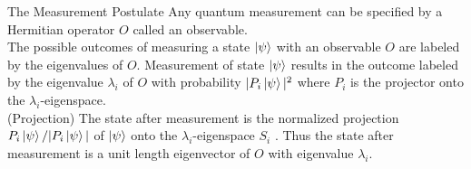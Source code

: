 \documentclass{beamer}
\begin{document}
\begin{frame}{The Measurement Postulate}
  {\tiny
    Any quantum measurement can be specified by a Hermitian operator $O$ called an observable.\\
    The possible outcomes of measuring a state $\ket{\psi}$ with an observable $O$ are labeled by the
    eigenvalues of $O$. Measurement of state $\ket{\psi}$ results in the outcome labeled by the eigenvalue $\lambda_i$
    of $O$ with probability $|P_i\ket{\psi}|^2$ where $P_i$ is the projector onto the $\lambda_i$-eigenspace.\\
    (Projection) The state after measurement is the normalized projection $P_i\ket{\psi} / |P_i\ket{\psi}|$ of $\ket{\psi}$
    onto the $\lambda_i$-eigenspace $S_i$ . Thus the state after measurement is a unit length eigenvector of $O$ with eigenvalue $\lambda_i$.
  }%
\end{frame}
\end{document}
